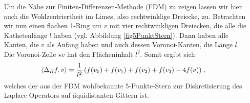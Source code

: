 \begin{bemerkung}
      Um die Nähe zur Finiten-Differenzen-Methode (FDM) zu zeigen lassen wir hier auch die Wohlzentriertheit im Limes, also rechtwinklige Dreiecke, zu.
      Betrachten wir nun einen flachen 1-Ring um \( v \) mit vier rechtwinkligen Dreiecken, die alle die Kathetenlänge \( l \) haben (vgl. Abbildung \ref{fig5PunktStern}).
      Dann haben alle Kanten, die \( v \) als Anfang haben und auch dessen Voronoi-Kanten, die Länge \( l \). 
      Die Voronoi-Zelle \( \star v \) hat den Flächeninhalt \( l^{2} \).
      Somit ergibt sich
      \begin{align}
        \left\langle \Delta_{B} f, v \right\rangle 
         &= \frac{1}{l^{2}}\left( f(v_{0}) + f(v_{1}) + f(v_{2}) + f(v_{3}) - 4f(v) \right) \,\text{,}
      \end{align}
      welches der aus der FDM wohlbekannte 5-Punkte-Stern zur Diskretisierung des Laplace-Operators auf äquidistanten Gittern ist. 
    \end{bemerkung}



